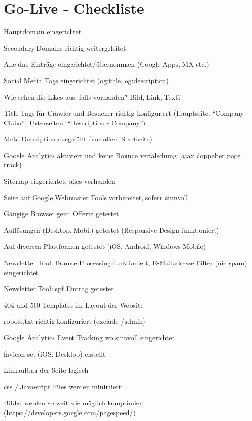 
\section{Go-Live - Checkliste}
\label{sec:appendix_go_live_checkliste}
\begin{checklist}
  \item Hauptdomain eingerichtet
  \item Secondary Domains richtig weitergeleitet
  \item Alle \acrshort{dns} Einträge eingerichtet/übernommen (Google Apps, MX etc.)
  \item Social Media Tags eingerichtet (og:title, og:description)
  \item Wie sehen die Likes aus, falls vorhanden? Bild, Link, Text?
  \item Title Tags für Crawler und Besucher richtig konfiguriert (Hauptseite: ``Company - Claim'', Unterseiten: ``Description - Company'')
  \item Meta Description ausgefüllt (vor allem Startseite)
  \item Google Analytics aktiviert und keine Bounce verfälschung (\acrshort{ajax} doppelter page track)
  \item Sitemap eingerichtet, alles vorhanden
  \item Seite auf Google Webmaster Tools vorbereitet, sofern sinnvoll
  \item Gängige Browser gem. Offerte getestet
  \item Auflösungen (Desktop, Mobil) getestet (Responsive Design funktioniert)
  \item Auf diversen Plattformen getestet (iOS, Android, Windows Mobile)
  \item Newsletter Tool: Bounce Processing funktioniert, E-Mailadresse Filter (nie spam) eingerichtet
  \item Newsletter Tool: \acrshort{spf} Eintrag getestet
  \item 404 und 500 Templates im Layout der Website
  \item robots.txt richtig konfiguriert (exclude /admin)
  \item Google Analytics Event Tracking wo sinnvoll eingerichtet
  \item favicon set (iOS, Desktop) erstellt
  \item Linkaufbau der Seite logisch
  \item \acrshort{css} / Javascript Files werden minimiert
  \item Bilder werden so weit wie möglich komprimiert (\url{https://developers.google.com/pagespeed/})

\end{checklist}
